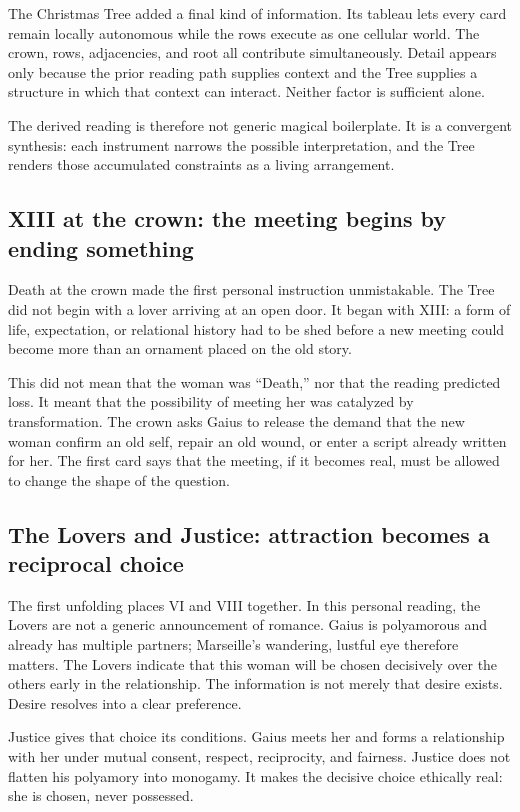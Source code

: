 The Christmas Tree added a final kind of information. Its tableau lets every
card remain locally autonomous while the rows execute as one cellular world.
The crown, rows, adjacencies, and root all contribute
simultaneously. Detail appears only because the prior reading path supplies
context and the Tree supplies a structure in which that context can interact.
Neither factor is sufficient alone.

The derived reading is therefore not generic magical boilerplate. It is a
convergent synthesis: each instrument narrows the possible interpretation, and
the Tree renders those accumulated constraints as a living arrangement.

\subsection{XIII at the crown: the meeting begins by ending something}

Death at the crown made the first personal instruction unmistakable. The Tree
did not begin with a lover arriving at an open door. It began with XIII: a form
of life, expectation, or relational history had to be shed before a new meeting
could become more than an ornament placed on the old story.

This did not mean that the woman was ``Death,'' nor that the reading predicted
loss. It meant that the possibility of meeting her was catalyzed by
transformation. The crown asks Gaius to release the demand that the new woman
confirm an old self, repair an old wound, or enter a script already written for
her. The first card says that the meeting, if it becomes real, must be allowed
to change the shape of the question.

\subsection{The Lovers and Justice: attraction becomes a reciprocal choice}

The first unfolding places VI and VIII together. In this personal reading, the
Lovers are not a generic announcement of romance. Gaius is polyamorous and
already has multiple partners; Marseille's wandering, lustful eye therefore
matters. The Lovers indicate that this woman will be chosen decisively over the
others early in the relationship. The information is not merely that desire
exists. Desire resolves into a clear preference.

Justice gives that choice its conditions. Gaius meets her and forms a
relationship with her under mutual consent, respect, reciprocity, and fairness.
Justice does not flatten his polyamory into monogamy. It makes the decisive
choice ethically real: she is chosen, never possessed.

